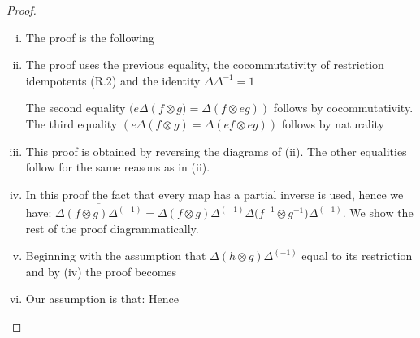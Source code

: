 \documentclass[11pt, oneside]{amsart}
\theoremstyle{definition}
\theoremstyle{definition}
\begin{document}
\begin{proof}~
\begin{enumerate}[(i)]
    \item The proof is the following
    \item The proof uses the previous equality, the cocommutativity of restriction idempotents (R.2) and the identity $\Delta{\Delta^{-1}}=1$
    
    
    The second equality $(e\Delta(f\otimes{g)}=\Delta(f\otimes{eg}))$ follows by cocommutativity. The third equality $(e\Delta(f\otimes{g})=\Delta(ef\otimes{eg}))$ follows by naturality
    \item This proof is obtained by reversing the diagrams of (ii). The other equalities follow for the same reasons as in (ii).
    \item In this proof the fact that every map has a partial inverse is used, hence we have: $\overline{\Delta({f}\otimes{g})\Delta^{(-1)}}=\Delta({f}\otimes{g})\Delta^{(-1)}\Delta({f^{-1}\otimes{g^{-1})\Delta^{(-1)}}}$. We show the rest of the proof diagrammatically.
    

\item Beginning with the assumption that $\Delta({h}\otimes{g})\Delta^{(-1)}$ equal to its restriction and by (iv) the proof becomes
 \item Our assumption is that:
 Hence 
\end{enumerate}
\end{proof}
 
\end{document}
